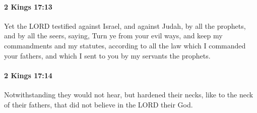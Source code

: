 		\paragraph{2 Kings 17:13} %
			\label{2KINGS-17-13}

			Yet the LORD testified against Israel, and against Judah, by all the prophets, and by all the seers, saying, Turn ye from your evil ways, and keep my commandments and my statutes, according to all the law which I commanded your fathers, and which I sent to you by my servants the prophets.


		\paragraph{2 Kings 17:14} %
			\label{2KINGS-17-14}

			Notwithstanding they would not hear, but hardened their necks, like to the neck of their fathers, that did not believe in the LORD their God.

